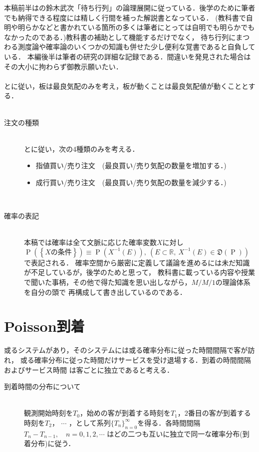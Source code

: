\documentclass[a4j,papersize,disablejfam,slide,14pt]{jsarticle}
\def\prob#1{\operatorname{P} \left(\left\{ #1 \right\}\right)} %
\begin{document}
    本稿前半は\cite{suzuki_queueing}の鈴木武次「待ち行列」の論理展開に従っている．後学のために筆者でも納得できる程度には精しく行間を補った解説書となっている．
    (教科書で自明や明らかなどと書かれている箇所の多くは筆者にとっては自明でも明らかでもなかったのである．)教科書の補助として機能するだけでなく，
    待ち行列にまつわる測度論や確率論のいくつかの知識も併せた少し便利な覚書であると自負している．
    本編後半は筆者の研究の詳細な記録である．間違いを発見された場合はその大小に拘わらず御教示願いたい．\\
    \mbox{}\\
    \cite{endo_zuo_kishimoto}と\cite{li_hui_endo_kishimoto}に従い，板は最良気配のみを考え，板が動くことは最良気配値が動くこととする．\\
    \mbox{}\\
    \begin{description}
    	\item[注文の種類]\mbox{}\\
     	\cite{endo_zuo_kishimoto}と\cite{li_hui_endo_kishimoto}に従い，次の4種類のみを考える．
    	\begin{itemize}
    		\item 指値買い/売り注文　(最良買い/売り気配の数量を増加する．)
        	\item 成行買い/売り注文　(最良買い/売り気配の数量を減少する．)
    	\end{itemize}
        \mbox{}\\
        \item[確率の表記]\mbox{}\\
        	本稿では確率は全て文脈に応じた確率変数$X$に対し$\prob{\mbox{$X$の条件}} \equiv \operatorname{P}(X^{-1}(E)),
            \ (E \subset \mathbb{R},\ X^{-1}(E) \in \mathfrak{D}(\operatorname{P}))$で表記される．
            確率空間から厳密に定義して議論を進めるには未だ知識が不足しているが，後学のためと思って，
            教科書に載っている内容や授業で聞いた事柄，その他で得た知識を思い出しながら，$M/M/1$の理論体系を自分の頭で
            再構成して書き出しているのである．
     \end{description}

\section{{\rm Poisson}到着}
    \begin{screen}
    或るシステムがあり，そのシステムには或る確率分布に従った時間間隔で客が訪れ，
    或る確率分布に従った時間だけサービスを受け退場する．到着の時間間隔およびサービス時間
    は客ごとに独立であると考える．
    \end{screen}
    \begin{description}
    	\item[到着時間の分布について]\mbox{}\\
    	観測開始時刻を$T_0$，始めの客が到着する時刻を$T_1$，$2$番目の客が到着する時刻を$T_2$，
    	$\cdots$ ，として系列$\{T_n\}_{n=0}^{\infty}$を得る．各時間間隔$T_n - T_{n-1},\quad n=0,1,2,\cdots$
    	はどの二つも互いに独立で同一な確率分布(到着分布)に従う．
    \end{description}
\end{document}
